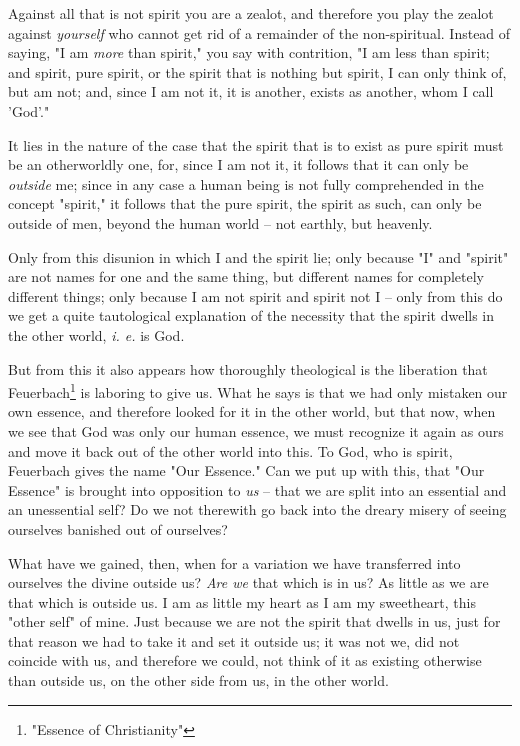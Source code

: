 Against all that is not spirit you are a zealot, and therefore you play the 
zealot against \textit{yourself} who cannot get rid of a remainder of the 
non-spiritual. Instead of saying, "{}I am \textit{more} than spirit,"{} you 
say with contrition, "{}I am less than spirit; and spirit, pure spirit, or the 
spirit that is nothing but spirit, I can only think of, but am not; and, since 
I am not it, it is another, exists as another, whom I call 'God'."{}

It lies in the nature of the case that the spirit that is to exist as pure 
spirit must be an otherworldly one, for, since I am not it, it follows that it 
can only be \textit{outside} me; since in any case a human being is not fully 
comprehended in the concept "{}spirit,"{} it follows that the pure spirit, the 
spirit as such, can only be outside of men, beyond the human world -- not 
earthly, but heavenly.

Only from this disunion in which I and the spirit lie; only because "{}I"{} 
and "{}spirit"{} are not names for one and the same thing, but different names 
for completely different things; only because I am not spirit and spirit not I 
-- only from this do we get a quite tautological explanation of the necessity 
that the spirit dwells in the other world, \textit{i. e.} is God.

But from this it also appears how thoroughly theological is the liberation 
that Feuerbach\footnote{"{}Essence of Christianity"{}} is laboring to give us. 
What he says is that we had only mistaken our own essence, and therefore 
looked for it in the other world, but that now, when we see that God was only 
our human essence, we must recognize it again as ours and move it back out of 
the other world into this. To God, who is spirit, Feuerbach gives the name 
"{}Our Essence."{} Can we put up with this, that "{}Our Essence"{} is brought 
into opposition to \textit{us} -- that we are split into an essential and an 
unessential self? Do we not therewith go back into the dreary misery of seeing 
ourselves banished out of ourselves?

What have we gained, then, when for a variation we have transferred into 
ourselves the divine outside us? \textit{Are we} that which is in us? As 
little as we are that which is outside us. I am as little my heart as I am my 
sweetheart, this "{}other self"{} of mine. Just because we are not the spirit 
that dwells in us, just for that reason we had to take it and set it outside 
us; it was not we, did not coincide with us, and therefore we could, not think 
of it as existing otherwise than outside us, on the other side from us, in the 
other world.

